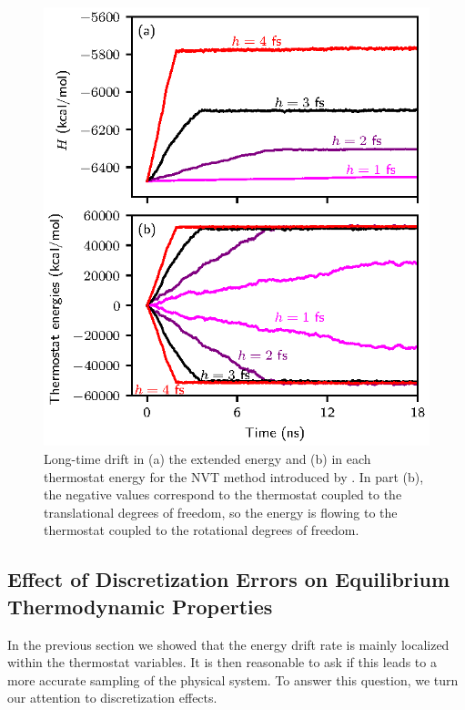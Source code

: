 \documentclass[
journal=jctcce,
layout=twocolumn
]{achemso}
\begin{document}
\begin{figure}
	\includegraphics{Figures/numerical_stability.eps}
    \caption{Long-time drift in (a) the extended energy and (b) in each thermostat energy for the NVT method introduced by \citeauthor{Kamberaj_2005} \cite{Kamberaj_2005}. In part (b), the negative values correspond to the thermostat coupled to the translational degrees of freedom, so the energy is flowing to the thermostat coupled to the rotational degrees of freedom.}
	\label{fig:num_stab}
\end{figure}

\subsection{Effect of Discretization Errors on Equilibrium Thermodynamic Properties}

In the previous section we showed that the energy drift rate is mainly localized within the thermostat variables.
It is then reasonable to ask if this leads to a more accurate sampling of the physical system.
To answer this question, we turn our attention to discretization effects.
\end{document}
